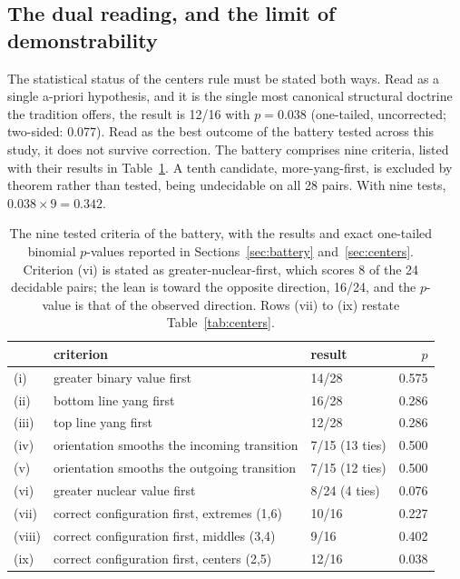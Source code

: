 \documentclass[11pt]{article}
\begin{document}
\subsection{The dual reading, and the limit of demonstrability}
\label{sec:dual}

The statistical status of the centers rule must be stated both ways. Read as a single a-priori hypothesis, and it is the single most canonical structural doctrine the tradition offers, the result is 12/16 with $p = 0.038$ (one-tailed, uncorrected; two-sided: 0.077). Read as the best outcome of the battery tested across this study, it does not survive correction. The battery comprises nine criteria, listed with their results in Table~\ref{tab:bateria}. A tenth candidate, more-yang-first, is excluded by theorem rather than tested, being undecidable on all 28 pairs. With nine tests, $0.038 \times 9 = 0.342$.

\begin{table}[t]
\centering
\caption{The nine tested criteria of the battery, with the results and exact one-tailed binomial $p$-values reported in Sections~\ref{sec:battery} and~\ref{sec:centers}. Criterion (vi) is stated as greater-nuclear-first, which scores 8 of the 24 decidable pairs; the lean is toward the opposite direction, 16/24, and the $p$-value is that of the observed direction. Rows (vii) to (ix) restate Table~\ref{tab:centers}.}
\label{tab:bateria}
\small
\begin{tabular}{@{}lllr@{}}
\toprule
& criterion & result & $p$ \\
\midrule
(i)    & greater binary value first                  & 14/28           & 0.575 \\
(ii)   & bottom line yang first                      & 16/28           & 0.286 \\
(iii)  & top line yang first                         & 12/28           & 0.286 \\
(iv)   & orientation smooths the incoming transition & 7/15 (13 ties)  & 0.500 \\
(v)    & orientation smooths the outgoing transition & 7/15 (12 ties)  & 0.500 \\
(vi)   & greater nuclear value first                 & 8/24 (4 ties)   & 0.076 \\
(vii)  & correct configuration first, extremes (1,6) & 10/16           & 0.227 \\
(viii) & correct configuration first, middles (3,4)  & 9/16            & 0.402 \\
(ix)   & correct configuration first, centers (2,5)  & 12/16           & 0.038 \\
\bottomrule
\end{tabular}
\end{table}
\end{document}
